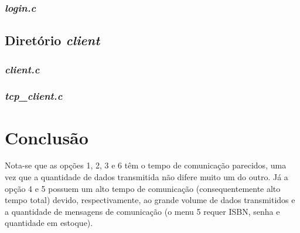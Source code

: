\documentclass[a4paper,10pt]{article}
\begin{document}
\subsubsection{\label{itm:login.c}\emph{login.c}}


\subsection{Diretório \textit{client}}
\subsubsection{\label{itm:client.c}\emph{client.c}}

\subsubsection{\label{itm:tcp_client.c}\emph{tcp\_client.c}}


\section{Conclusão}
Nota-se que as opções 1, 2, 3 e 6 têm o tempo de comunicação parecidos, uma vez que a quantidade de dados transmitida não difere muito um do outro. Já a opção 4 e 5 
possuem um alto tempo de comunicação (consequentemente alto tempo total) devido, respectivamente, ao grande volume de dados transmitidos e a quantidade de mensagens
de comunicação (o menu 5 requer ISBN, senha e quantidade em estoque).
\end{document}
